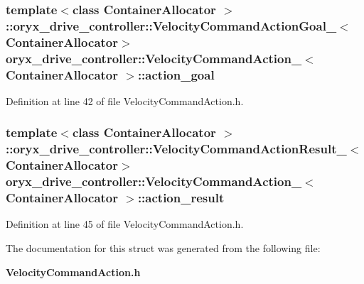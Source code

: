 \subsubsection[{action\-\_\-goal}]{\setlength{\rightskip}{0pt plus 5cm}template$<$class Container\-Allocator $>$ \-::{\bf oryx\-\_\-drive\-\_\-controller\-::\-Velocity\-Command\-Action\-Goal\-\_\-}$<$\-Container\-Allocator$>$ {\bf oryx\-\_\-drive\-\_\-controller\-::\-Velocity\-Command\-Action\-\_\-}$<$ \-Container\-Allocator $>$\-::{\bf action\-\_\-goal}}\label{structoryx__drive__controller_1_1VelocityCommandAction___af9e77c4ae2aff150eb3199bff380fe9e}


\-Definition at line 42 of file \-Velocity\-Command\-Action.\-h.

\subsubsection[{action\-\_\-result}]{\setlength{\rightskip}{0pt plus 5cm}template$<$class Container\-Allocator $>$ \-::{\bf oryx\-\_\-drive\-\_\-controller\-::\-Velocity\-Command\-Action\-Result\-\_\-}$<$\-Container\-Allocator$>$ {\bf oryx\-\_\-drive\-\_\-controller\-::\-Velocity\-Command\-Action\-\_\-}$<$ \-Container\-Allocator $>$\-::{\bf action\-\_\-result}}\label{structoryx__drive__controller_1_1VelocityCommandAction___aa43af8268c1568cb122a2b493ae95947}


\-Definition at line 45 of file \-Velocity\-Command\-Action.\-h.



\-The documentation for this struct was generated from the following file\-:\begin{DoxyCompactItemize}
\item 
{\bf \-Velocity\-Command\-Action.\-h}\end{DoxyCompactItemize}
